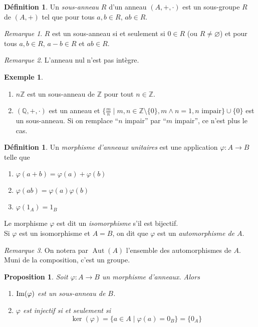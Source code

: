 \documentclass{article}
\newcommand{\Z}{\mathbb{Z}}
\newcommand{\Q}{\mathbb{Q}}
\DeclareMathOperator{\Aut}{Aut}
\renewcommand{\Im}{\mathop{\rm Im}}
\theoremstyle{plain}
\newtheorem{proposition}[theorem]{Proposition}
\theoremstyle{definition}
\newtheorem{definition}[theorem]{Définition}
\newtheorem{example}[theorem]{Exemple}
\theoremstyle{remark}
\newtheorem*{remark}{Remarque}
\begin{document}
\begin{definition}
    Un \emph{sous-anneau} $R$ d'un anneau $(A,+,\cdot)$ est un sous-groupe $R$ de $(A,+)$ tel que pour tous $a,b \in R$, $ab \in R$.
\end{definition}

\begin{remark}
    $R$ est un sous-anneau si et seulement si $0 \in R$ (ou $R \ne \varnothing$) et pour tous $a,b \in R$, $a-b \in R$ et $ab \in R$.
\end{remark}

\begin{remark}
    L'anneau nul n'est pas intègre.
\end{remark}

\begin{example} \leavevmode
    \begin{enumerate}
        \item $n\Z$ est un sous-anneau de $\Z$ pour tout $n \in \Z$.
        \item $(\Q,+,\cdot)$ est un anneau et $\{\frac{m}{n} \mid m,n \in \Z \setminus\{0\}, m \wedge n = 1, n\text{ impair}\} \cup \{0\}$ est un sous-anneau. Si on remplace ``$n$ impair'' par ``$m$ impair'', ce n'est plus le cas.
    \end{enumerate}
\end{example}

\begin{definition}
    Un \emph{morphisme d'anneaux unitaires} est une application $\varphi : A \to B$ telle que
    \begin{enumerate}
        \item $\varphi(a+b) = \varphi(a)+\varphi(b)$
        \item $\varphi(ab) = \varphi(a)\varphi(b)$
        \item $\varphi(1_A) = 1_B$
    \end{enumerate}
    Le morphisme $\varphi$ est dit un \emph{isomorphisme} s'il est bijectif. \\
    Si $\varphi$ est un isomorphisme et $A=B$, on dit que $\varphi$ est un \emph{automorphisme de $A$}.
\end{definition}

\begin{remark}
    On notera par $\Aut(A)$ l'ensemble des automorphismes de $A$. Muni de la composition, c'est un groupe.
\end{remark}

\begin{proposition}
    Soit $\varphi : A \to B$ un morphisme d'anneaux. Alors
    \begin{enumerate}
        \item $\Im(\varphi)$ est un sous-anneau de $B$.
        \item $\varphi$ est injectif si et seulement si
        \[\ker (\varphi) = \{a \in A \mid \varphi(a) = 0_B\} = \{0_A\}\]
    \end{enumerate}
\end{proposition}
\end{document}
